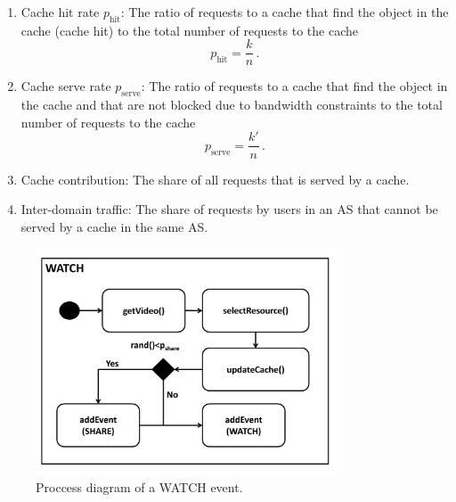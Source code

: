 \begin{enumerate}
\item Cache hit rate $p_\text{hit}$: The ratio of requests to a cache that find the object in the cache (cache hit) to the total number of requests to the cache
\begin{equation}
  p_\text{hit}=\frac{k}{n} \, .
\end{equation}
\item Cache serve rate $p_\text{serve}$: The ratio of requests to a cache that find the object in the cache and that are not blocked due to bandwidth constraints to the total number of requests to the cache
\begin{equation}
  p_\text{serve}=\frac{k'}{n} \, .
\end{equation}
\item Cache contribution: The share of all requests that is served by a cache.
\item Inter-domain traffic: The share of requests by users in an AS that cannot be served by a cache in the same AS.
\end{enumerate}

\begin{figure}[bt]
  \centering
  \includegraphics[width=0.8\textwidth]{hierarchical/simulative/figures/watch}
  \caption{Proccess diagram of a WATCH event.}
  \label{fig:WATCH}
\end{figure}

